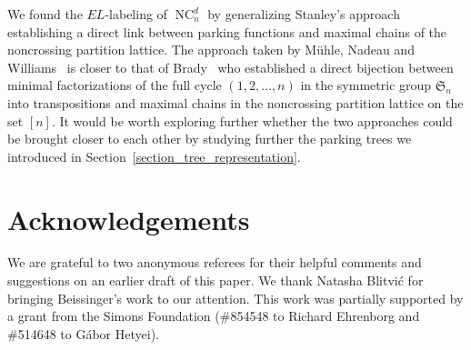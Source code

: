 \documentclass[11pt]{amsart}
\numberwithin{equation}{section}
\DeclareMathOperator{\NC}{NC}
\begin{document}
We found the $EL$-labeling of $\NC^{d}_{n}$ by generalizing Stanley's
approach~\cite{Stanley} establishing a direct link between parking
functions and maximal chains of the noncrossing partition lattice. The
approach taken by M\"uhle, Nadeau and
Williams~\cite{Muhle_Nadeau_Williams} is closer to that of
Brady~\cite{Brady}  who established a direct bijection between minimal
factorizations of the full cycle $(1,2,\ldots,n)$ in the symmetric group
$\mathfrak{S}_{n}$ into transpositions and maximal chains in the noncrossing
partition lattice on the set $[n]$. It would be worth exploring further
whether the two approaches could be brought closer to each other by
studying further the parking trees we introduced in
Section~\ref{section_tree_representation}. 

\section*{Acknowledgements}

We are grateful to two anonymous referees for their helpful comments and
suggestions on an earlier draft of this paper. We thank Natasha Blitvi\'c
for bringing Beissinger's work to our attention. This work was partially
supported by a grant from the Simons Foundation
(\#854548 to Richard Ehrenborg and \#514648 to G\'abor Hetyei). 


\newcommand{\journal}[6]{{\sc #1,} #2, {\it #3} {\bf #4} (#5), #6.}
\newcommand{\book}[4]{{\sc #1,} ``#2,'' #3, #4.}
\newcommand{\bookf}[5]{{\sc #1,} ``#2,'' #3, #4, #5.}
\newcommand{\arxiv}[3]{{\sc #1,} #2, {\tt #3}.}
\newcommand{\thesis}[4]{{\sc #1,} ``#2,'' Doctoral dissertation, #3,~#4.}
\newcommand{\preprint}[3]{{\sc #1,} #2, preprint {(#3)}.}
\newcommand{\preparation}[2]{{\sc #1,} #2, in preparation.}
\newcommand{\toappear}[3]{{\sc #1,} #2, to appear in {\it #3}.}
\end{document}
